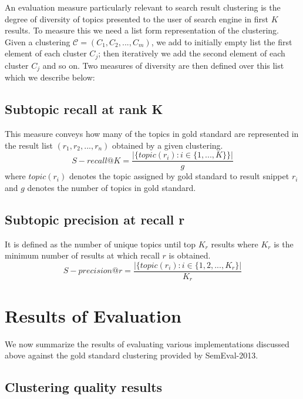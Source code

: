 \documentclass[a4paper,12pt]{report}
\begin{document}
An evaluation measure particularly relevant to search result
clustering is the degree of diversity of topics presented to the user
of search engine in first $K$ results. To measure this we need a list
form representation of the clustering. Given a clustering $\mathcal{C}
= (C_1,C_2,...,C_m)$, we add to initially empty list the first element
of each cluster $C_j$; then iteratively we add the second element of
each cluster $C_j$ and so on. Two measures of diversity are then
defined over this list which we describe below:

\subsection{Subtopic recall at rank K}
This measure conveys how many of the topics in gold standard are
represented in the result list $(r_1,r_2,...,r_n)$ obtained by a given
clustering.
$$
S-recall@K = \frac{|\{topic(r_i): i \in \{1,...,K\}\}|}{g}
$$
where $topic(r_i)$ denotes the topic assigned by gold standard to
result snippet $r_i$ and $g$ denotes the number of topics in gold
standard.

\subsection{Subtopic precision at recall r}
It is defined as the number of unique topics until top $K_r$ results
where $K_r$ is the minimum number of results at which recall $r$ is
obtained.
$$
S-precision@r = \frac{|\{topic(r_i): i \in \{1,2,...,K_r\}|}{K_r}
$$

\section{Results of Evaluation}

We now summarize the results of evaluating various implementations
discussed above against the gold standard clustering provided by
SemEval-2013.
\subsection{Clustering quality results}
\end{document}
